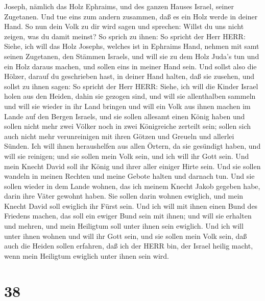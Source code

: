 Joseph, nämlich das Holz Ephraims, und des ganzen Hauses Israel, seiner
Zugetanen.  Und tue eins zum andern zusammen, daß es ein
Holz werde in deiner Hand.  So nun dein Volk zu dir wird
sagen und sprechen: Willst du uns nicht zeigen, was du damit meinst?
 So sprich zu ihnen: So spricht der Herr HERR: Siehe, ich
will das Holz Josephs, welches ist in Ephraims Hand, nehmen mit samt
seinen Zugetanen, den Stämmen Israels, und will sie zu dem Holz Juda's
tun und ein Holz daraus machen, und sollen eins in meiner Hand sein.
 Und sollst also die Hölzer, darauf du geschrieben hast, in
deiner Hand halten, daß sie zusehen,  und sollst zu ihnen
sagen: So spricht der Herr HERR: Siehe, ich will die Kinder Israel holen
aus den Heiden, dahin sie gezogen sind, und will sie allenthalben
sammeln und will sie wieder in ihr Land bringen  und will
ein Volk aus ihnen machen im Lande auf den Bergen Israels, und sie
sollen allesamt einen König haben und sollen nicht mehr zwei Völker noch
in zwei Königreiche zerteilt sein;  sollen sich auch nicht
mehr verunreinigen mit ihren Götzen und Greueln und allerlei Sünden. Ich
will ihnen heraushelfen aus allen Örtern, da sie gesündigt haben, und
will sie reinigen; und sie sollen mein Volk sein, und ich will ihr Gott
sein.  Und mein Knecht David soll ihr König und ihrer aller
einiger Hirte sein. Und sie sollen wandeln in meinen Rechten und meine
Gebote halten und darnach tun.  Und sie sollen wieder in
dem Lande wohnen, das ich meinem Knecht Jakob gegeben habe, darin ihre
Väter gewohnt haben. Sie sollen darin wohnen ewiglich, und mein Knecht
David soll ewiglich ihr Fürst sein.  Und ich will mit ihnen
einen Bund des Friedens machen, das soll ein ewiger Bund sein mit ihnen;
und will sie erhalten und mehren, und mein Heiligtum soll unter ihnen
sein ewiglich.  Und ich will unter ihnen wohnen und will
ihr Gott sein, und sie sollen mein Volk sein,  daß auch die
Heiden sollen erfahren, daß ich der HERR bin, der Israel heilig macht,
wenn mein Heiligtum ewiglich unter ihnen sein wird.

\hypertarget{section-37}{%
\section{38}\label{section-37}}

